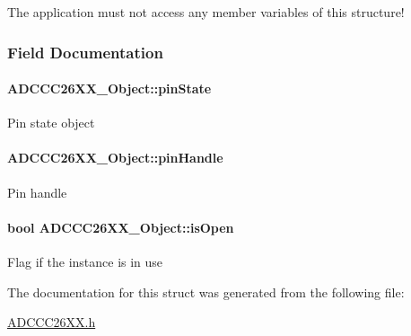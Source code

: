 The application must not access any member variables of this structure! 

\subsubsection{Field Documentation}
\paragraph[{pin\+State}]{ A\+D\+C\+C\+C26\+X\+X\+\_\+\+Object\+::pin\+State}\label{struct_a_d_c_c_c26_x_x___object_a1cdfdc98a89833d7b4631aecadb755d7}
Pin state object 
\paragraph[{pin\+Handle}]{ A\+D\+C\+C\+C26\+X\+X\+\_\+\+Object\+::pin\+Handle}\label{struct_a_d_c_c_c26_x_x___object_ae95f4f01036f8a612134521372c767c5}
Pin handle 
\paragraph[{is\+Open}]{\setlength{\rightskip}{0pt plus 5cm}bool A\+D\+C\+C\+C26\+X\+X\+\_\+\+Object\+::is\+Open}\label{struct_a_d_c_c_c26_x_x___object_a6783122cf267cb0353e6ca9f519cdbc9}
Flag if the instance is in use 

The documentation for this struct was generated from the following file\+:\begin{DoxyCompactItemize}
\item 
\hyperlink{_a_d_c_c_c26_x_x_8h}{A\+D\+C\+C\+C26\+X\+X.\+h}\end{DoxyCompactItemize}
